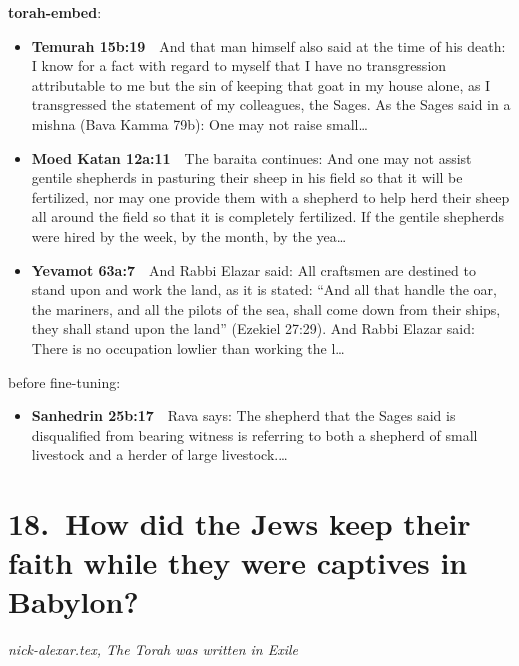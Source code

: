 \documentclass[11pt,a4paper]{article}
\begin{document}
{\color{quiet}\small\textbf{torah-embed}:}
\begin{itemize}[leftmargin=1.2em,itemsep=3pt]
\item {\color{ref}\textbf{Temurah 15b:19}}\ \ And that man himself also said at the time of his death: I know for a fact with regard to myself that I have no transgression attributable to me but the sin of keeping that goat in my house alone, as I transgressed the statement of my colleagues, the Sages. As the Sages said in a mishna (Bava Kamma 79b): One may not raise small\ldots
\item {\color{ref}\textbf{Moed Katan 12a:11}}\ \ The baraita continues: And one may not assist gentile shepherds in pasturing their sheep in his field so that it will be fertilized, nor may one provide them with a shepherd to help herd their sheep all around the field so that it is completely fertilized. If the gentile shepherds were hired by the week, by the month, by the yea\ldots
\item {\color{ref}\textbf{Yevamot 63a:7}}\ \ And Rabbi Elazar said: All craftsmen are destined to stand upon and work the land, as it is stated: “And all that handle the oar, the mariners, and all the pilots of the sea, shall come down from their ships, they shall stand upon the land” (Ezekiel 27:29). And Rabbi Elazar said: There is no occupation lowlier than working the l\ldots
\end{itemize}
{\color{quiet}\small before fine-tuning:}
\begin{itemize}[leftmargin=1.2em]
\item {\color{ref}\textbf{Sanhedrin 25b:17}}\ \ Rava says: The shepherd that the Sages said is disqualified from bearing witness is referring to both a shepherd of small livestock and a herder of large livestock.\ldots
\end{itemize}

\section*{18.\ How did the Jews keep their faith while they were captives in Babylon?}
{\color{quiet}\small\textit{nick-alexar.tex, The Torah was written in Exile}}
\end{document}
